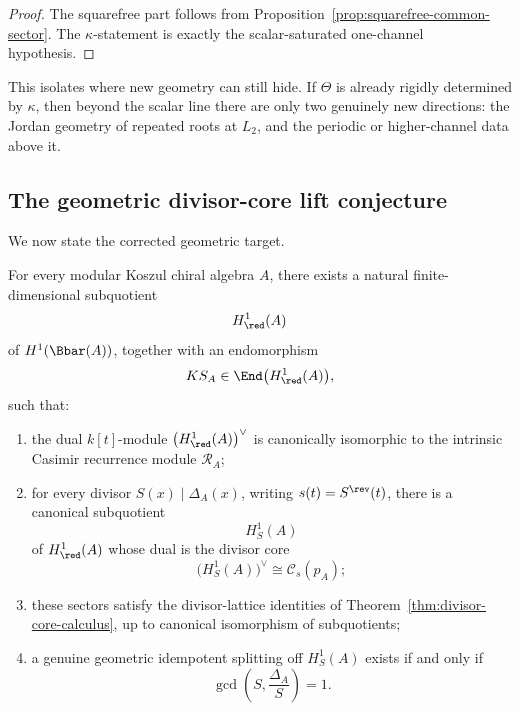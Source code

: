 \begin{proof}
The squarefree part follows from Proposition~\ref{prop:squarefree-common-sector}.
The \(\kappa\)-statement is exactly the scalar-saturated one-channel hypothesis.
\end{proof}

\begin{remark}
This isolates where new geometry can still hide.
If \(\Theta\) is already rigidly determined by \(\kappa\), then beyond the scalar line there are only two genuinely new directions:
the Jordan geometry of repeated roots at \(L_2\), and the periodic or higher-channel data above it.
\end{remark}

\subsection{The geometric divisor-core lift conjecture}

We now state the corrected geometric target.

\begin{conjecture}
\ClaimStatusConjectured
\label{conj:geometric-divisor-core-lift}
For every modular Koszul chiral algebra \(A\), there exists a natural finite-dimensional subquotient
\[
H^1_{\red}(A)
\]
of \(H^1(\Bbar(A))\), together with an endomorphism
\[
KS_A\in \End\bigl(H^1_{\red}(A)\bigr),
\]
such that:
\begin{enumerate}[label=\textup{(\roman*)}]
\item the dual \(k[t]\)-module \(\bigl(H^1_{\red}(A)\bigr)^\vee\) is canonically isomorphic to the intrinsic Casimir recurrence module \(\mathcal R_A\);

\item for every divisor \(S(x)\mid \Delta_A(x)\), writing \(s(t)=S^{\rev}(t)\), there is a canonical subquotient
\[
H^1_S(A)
\]
of \(H^1_{\red}(A)\) whose dual is the divisor core
\[
\bigl(H^1_S(A)\bigr)^\vee \cong \mathcal C_s(p_A);
\]

\item these sectors satisfy the divisor-lattice identities of Theorem~\ref{thm:divisor-core-calculus}, up to canonical isomorphism of subquotients;

\item a genuine geometric idempotent splitting off \(H^1_S(A)\) exists if and only if
\[
\gcd\!\left(S,\frac{\Delta_A}{S}\right)=1.
\]
\end{enumerate}
\end{conjecture}

